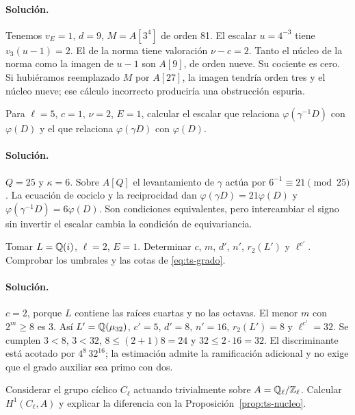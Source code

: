 \paragraph{Solución.} Tenemos $v_E=1$, $d=9$, $M=A[3^4]$ de orden 81. El escalar $u=4^{-3}$ tiene $v_3(u-1)=2$. El de la norma tiene valoración $\nu-c=2$. Tanto el núcleo de la norma como la imagen de $u-1$ son $A[9]$, de orden nueve. Su cociente es cero. Si hubiéramos reemplazado $M$ por $A[27]$, la imagen tendría orden tres y el núcleo nueve; ese cálculo incorrecto produciría una obstrucción espuria.

\begin{ejercicio}
Para $\ell=5$, $c=1$, $\nu=2$, $E=1$, calcular el escalar que relaciona $\varphi(\gamma^{-1}D)$ con $\varphi(D)$ y el que relaciona $\varphi(\gamma D)$ con $\varphi(D)$.
\end{ejercicio}
\paragraph{Solución.} $Q=25$ y $\kappa=6$. Sobre $A[Q]$ el levantamiento de $\gamma$ actúa por $6^{-1}\equiv21\pmod{25}$. La ecuación de cociclo y la reciprocidad dan $\varphi(\gamma D)=21\varphi(D)$ y $\varphi(\gamma^{-1}D)=6\varphi(D)$. Son condiciones equivalentes, pero intercambiar el signo sin invertir el escalar cambia la condición de equivariancia.

\begin{ejercicio}
Tomar $L=\mathbb{Q}(i)$, $\ell=2$, $E=1$. Determinar $c$, $m$, $d'$, $n'$, $r_2(L')$ y $\ell^{c'}$. Comprobar los umbrales y las cotas de \eqref{eq:ts-grado}.
\end{ejercicio}
\paragraph{Solución.} $c=2$, porque $L$ contiene las raíces cuartas y no las octavas. El menor $m$ con $2^m\ge8$ es $3$. Así $L'=\mathbb{Q}(\mu_{32})$, $c'=5$, $d'=8$, $n'=16$, $r_2(L')=8$ y $\ell^{c'}=32$. Se cumplen $3<8$, $3<32$, $8\le(2+1)8=24$ y $32\le2\cdot16=32$. El discriminante está acotado por $4^8\,32^{16}$; la estimación admite la ramificación adicional y no exige que el grado auxiliar sea primo con dos.

\begin{ejercicio}
Considerar el grupo cíclico $C_\ell$ actuando trivialmente sobre $A=\mathbb{Q}_\ell/\mathbb{Z}_\ell$. Calcular $H^1(C_\ell,A)$ y explicar la diferencia con la Proposición~\ref{prop:ts-nucleo}.
\end{ejercicio}
